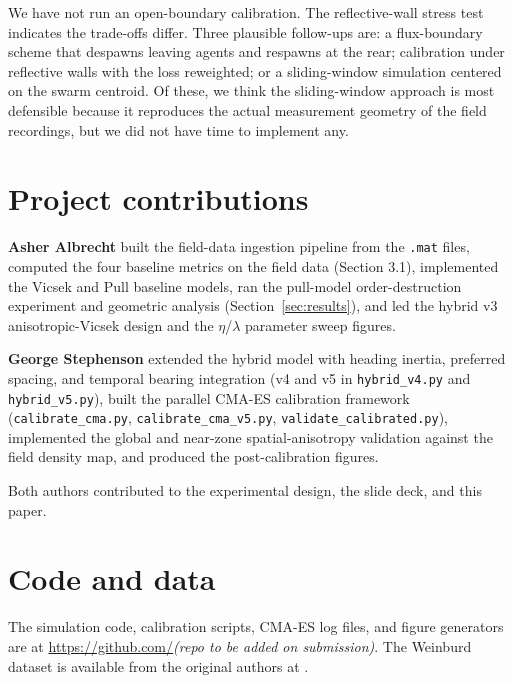 \documentclass[11pt]{article}
\begin{document}
We have not run an open-boundary calibration. The reflective-wall
stress test indicates the trade-offs differ. Three plausible follow-ups
are: a flux-boundary scheme that despawns leaving agents and respawns at
the rear; calibration under reflective walls with the loss reweighted;
or a sliding-window simulation centered on the swarm centroid. Of
these, we think the sliding-window approach is most defensible because
it reproduces the actual measurement geometry of the
\citet{weinburd2024} field recordings, but we did not have time to
implement any.

\section{Project contributions}

\textbf{Asher Albrecht} built the field-data ingestion pipeline from the
\citet{weinburd2024} \texttt{.mat} files, computed the four baseline
metrics on the field data (Section 3.1), implemented the Vicsek and Pull
baseline models, ran the pull-model order-destruction experiment and
geometric analysis (Section~\ref{sec:results}), and led the hybrid v3
anisotropic-Vicsek design and the $\eta$/$\lambda$ parameter sweep
figures.

\textbf{George Stephenson} extended the hybrid model with heading inertia,
preferred spacing, and temporal bearing integration (v4 and v5 in
\texttt{hybrid\_v4.py} and \texttt{hybrid\_v5.py}), built the parallel
CMA-ES calibration framework (\texttt{calibrate\_cma.py},
\texttt{calibrate\_cma\_v5.py}, \texttt{validate\_calibrated.py}),
implemented the global and near-zone spatial-anisotropy validation
against the field density map, and produced the post-calibration
figures.

Both authors contributed to the experimental design, the slide deck,
and this paper.

\section*{Code and data}

The simulation code, calibration scripts, CMA-ES log files, and figure
generators are at \url{https://github.com/}\textit{(repo to be added on
submission)}. The Weinburd dataset is available from the original
authors at \citet{weinburd2024}.



\end{document}
